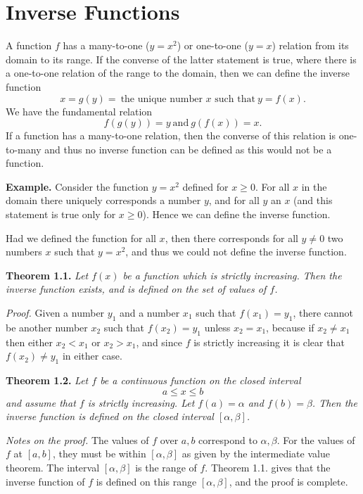 \chapter*{Inverse Functions}
A function $f$ has a many-to-one ($y = x^2$) or one-to-one ($y = x$) relation from its domain to its range. If the converse of the latter statement is true, where there is a one-to-one relation of the range to the domain, then we can define the inverse function
\[x = g(y) =\: \text{the unique number $x$ such that}\: y = f(x).\]
We have the fundamental relation
\[f(g(y)) = y\: \text{and}\: g(f(x)) = x.\]
If a function has a many-to-one relation, then the converse of this relation is one-to-many and thus no inverse function can be defined as this would not be a function.

\textbf{Example.} Consider the function $y = x^2$ defined for $x \ge 0$. For all $x$ in the domain there uniquely corresponds a number $y$, and for all $y$ an $x$ (and this statement is true only for $x \ge 0$). Hence we can define the inverse function.

Had we defined the function for all $x$, then there corresponds for all $y \ne 0$ two numbers $x$ such that $y = x^2$, and thus we could not define the inverse function.

\textbf{Theorem 1.1.} \textit{Let $f(x)$ be a function which is strictly increasing. Then the inverse function exists, and is defined on the set of values of $f$.}

\textit{Proof.} Given a number $y_1$ and a number $x_1$ such that $f(x_1) = y_1$, there cannot be another number $x_2$ such that $f(x_2) = y_1$ unless $x_2 = x_1$, because if $x_2 \ne x_1$ then either $x_2 < x_1$ or $x_2 > x_1$, and since $f$ is strictly increasing it is clear that $f(x_2) \ne y_1$ in either case.

\textbf{Theorem 1.2.} \textit{Let $f$ be a continuous function on the closed interval
  \[a \le x \le b\]
  and assume that $f$ is strictly increasing. Let $f(a) = \alpha$ and $f(b) = \beta$. Then the inverse function is defined on the closed interval $[\alpha, \beta]$.}

\textit{Notes on the proof.} The values of $f$ over $a, b$ correspond to $\alpha, \beta$. For the values of $f$ at $[a, b]$, they must be within $[\alpha, \beta]$ as given by the intermediate value theorem. The interval $[\alpha, \beta]$ is the range of $f$. Theorem 1.1. gives that the inverse function of $f$ is defined on this range $[\alpha, \beta]$, and the proof is complete.

